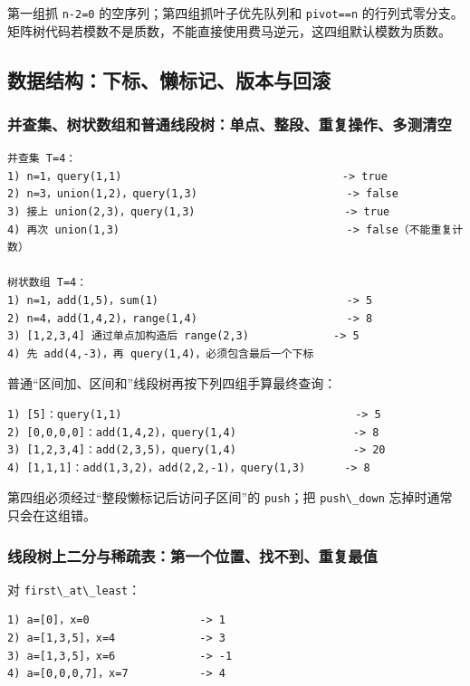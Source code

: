 第一组抓 \passthrough{\lstinline!n-2=0!} 的空序列；第四组抓叶子优先队列和 \passthrough{\lstinline!pivot==n!} 的行列式零分支。矩阵树代码若模数不是质数，不能直接使用费马逆元，这四组默认模数为质数。

\subsection{数据结构：下标、懒标记、版本与回滚}

\subsubsection{并查集、树状数组和普通线段树：单点、整段、重复操作、多测清空}

\begin{lstlisting}
并查集 T=4：
1) n=1，query(1,1)                                  -> true
2) n=3，union(1,2)，query(1,3)                       -> false
3) 接上 union(2,3)，query(1,3)                       -> true
4) 再次 union(1,3)                                   -> false（不能重复计数）

树状数组 T=4：
1) n=1，add(1,5)，sum(1)                             -> 5
2) n=4，add(1,4,2)，range(1,4)                       -> 8
3) [1,2,3,4] 通过单点加构造后 range(2,3)             -> 5
4) 先 add(4,-3)，再 query(1,4)，必须包含最后一个下标
\end{lstlisting}

普通``区间加、区间和''线段树再按下列四组手算最终查询：

\begin{lstlisting}
1) [5]：query(1,1)                                    -> 5
2) [0,0,0,0]：add(1,4,2)，query(1,4)                  -> 8
3) [1,2,3,4]：add(2,3,5)，query(1,4)                  -> 20
4) [1,1,1]：add(1,3,2)，add(2,2,-1)，query(1,3)      -> 8
\end{lstlisting}

第四组必须经过``整段懒标记后访问子区间''的 \passthrough{\lstinline!push!}；把 \passthrough{\lstinline!push\_down!} 忘掉时通常只会在这组错。

\subsubsection{线段树上二分与稀疏表：第一个位置、找不到、重复最值}

对 \passthrough{\lstinline!first\_at\_least!}：

\begin{lstlisting}
1) a=[0]，x=0                 -> 1
2) a=[1,3,5]，x=4             -> 3
3) a=[1,3,5]，x=6             -> -1
4) a=[0,0,0,7]，x=7           -> 4
\end{lstlisting}

